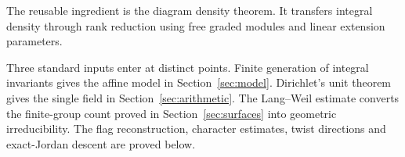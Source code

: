 The reusable ingredient is the diagram density theorem. It transfers
integral density through rank reduction using free graded modules and
linear extension parameters.

Three standard inputs enter at distinct points.  Finite generation
of integral invariants gives the affine model in
Section~\ref{sec:model}.  Dirichlet's unit theorem gives the single
field in Section~\ref{sec:arithmetic}.  The Lang--Weil estimate
converts the finite-group count proved in Section~\ref{sec:surfaces}
into geometric irreducibility.  The flag reconstruction, character
estimates, twist directions and exact-Jordan descent are proved below.
